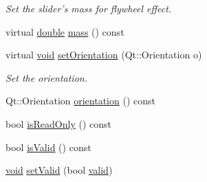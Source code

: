 \begin{DoxyCompactItemize}
\begin{DoxyCompactList}\small\item\em Set the slider's mass for flywheel effect. \end{DoxyCompactList}\item 
virtual \hyperlink{_super_l_u_support_8h_a8956b2b9f49bf918deed98379d159ca7}{double} \hyperlink{class_qwt_abstract_slider_a1bfc8126a2ab01c83e8fa5e64b95de03}{mass} () const 
\item 
virtual \hyperlink{group___u_a_v_objects_plugin_ga444cf2ff3f0ecbe028adce838d373f5c}{void} \hyperlink{class_qwt_abstract_slider_a6b0fdc50bfbb0a8bb40f0dc6bf493b2c}{set\-Orientation} (Qt\-::\-Orientation o)
\begin{DoxyCompactList}\small\item\em Set the orientation. \end{DoxyCompactList}\item 
Qt\-::\-Orientation \hyperlink{class_qwt_abstract_slider_a4d2521b9c31ec64b71d8e1771b156d88}{orientation} () const 
\item 
bool \hyperlink{class_qwt_abstract_slider_a040fd1fd03592c524314bf4b5539608d}{is\-Read\-Only} () const 
\item 
bool \hyperlink{class_qwt_abstract_slider_a87c750f098cb5f70306a7908339cb88e}{is\-Valid} () const 
\item 
\hyperlink{group___u_a_v_objects_plugin_ga444cf2ff3f0ecbe028adce838d373f5c}{void} \hyperlink{class_qwt_abstract_slider_a79d99f14ebd47dfede8135845c90cedb}{set\-Valid} (bool \hyperlink{class_qwt_abstract_slider_a65a589ff3bbfdeb3b5f099bbf7c5e45a}{valid})
\end{DoxyCompactItemize}
